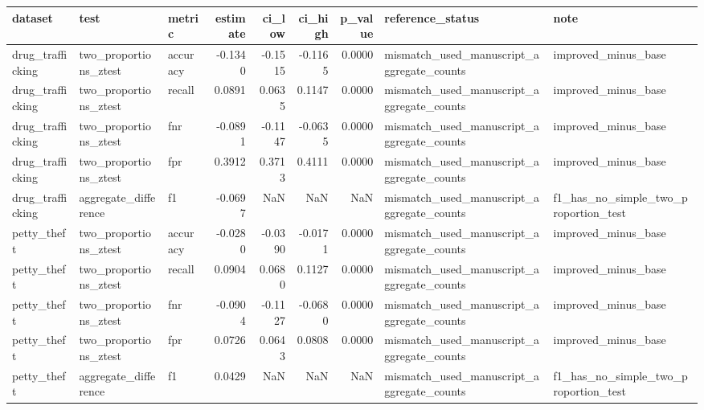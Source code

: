 \begin{tabular}{lllrrrrll}
\toprule
dataset & test & metric & estimate & ci_low & ci_high & p_value & reference_status & note \\
\midrule
drug_trafficking & two_proportions_ztest & accuracy & -0.1340 & -0.1515 & -0.1165 & 0.0000 & mismatch_used_manuscript_aggregate_counts & improved_minus_base \\
drug_trafficking & two_proportions_ztest & recall & 0.0891 & 0.0635 & 0.1147 & 0.0000 & mismatch_used_manuscript_aggregate_counts & improved_minus_base \\
drug_trafficking & two_proportions_ztest & fnr & -0.0891 & -0.1147 & -0.0635 & 0.0000 & mismatch_used_manuscript_aggregate_counts & improved_minus_base \\
drug_trafficking & two_proportions_ztest & fpr & 0.3912 & 0.3713 & 0.4111 & 0.0000 & mismatch_used_manuscript_aggregate_counts & improved_minus_base \\
drug_trafficking & aggregate_difference & f1 & -0.0697 & NaN & NaN & NaN & mismatch_used_manuscript_aggregate_counts & f1_has_no_simple_two_proportion_test \\
petty_theft & two_proportions_ztest & accuracy & -0.0280 & -0.0390 & -0.0171 & 0.0000 & mismatch_used_manuscript_aggregate_counts & improved_minus_base \\
petty_theft & two_proportions_ztest & recall & 0.0904 & 0.0680 & 0.1127 & 0.0000 & mismatch_used_manuscript_aggregate_counts & improved_minus_base \\
petty_theft & two_proportions_ztest & fnr & -0.0904 & -0.1127 & -0.0680 & 0.0000 & mismatch_used_manuscript_aggregate_counts & improved_minus_base \\
petty_theft & two_proportions_ztest & fpr & 0.0726 & 0.0643 & 0.0808 & 0.0000 & mismatch_used_manuscript_aggregate_counts & improved_minus_base \\
petty_theft & aggregate_difference & f1 & 0.0429 & NaN & NaN & NaN & mismatch_used_manuscript_aggregate_counts & f1_has_no_simple_two_proportion_test \\
\bottomrule
\end{tabular}
